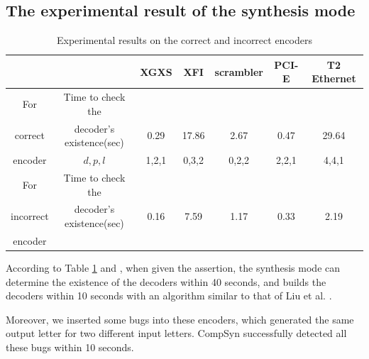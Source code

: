 \documentclass[runningheads,a4paper]{llncs}
\begin{document}
\subsection{The experimental result of the synthesis mode}
\begin{table}[t]
\centering
\caption{Experimental results on the correct and incorrect encoders}
\begin{tabular}{|c|c|c|c|c|c|c|}
\hline
&                                        &XGXS     &XFI       &scrambler     &PCI-E    &T2 Ethernet\\ \hline\hline
For &Time to check the                         &&&&&\\
correct&decoder's existence(sec)                      &0.29     &17.86     &2.67      &0.47    &29.64\\\cline{2-7}
encoder&$d,p,l$                                 &1,2,1    &0,3,2     &0,2,2     &2,2,1   &4,4,1          \\ \hline\hline
For&Time to check the                          &&&&&\\
incorrect&decoder's existence(sec)             &0.16     &7.59     &1.17      &0.33    &2.19\\
encoder&                        &&&&&\\\hline

\end{tabular}\label{tab_prodes}
\end{table}

According to Table \ref{tab_prodes} and \cite{ShengYuShen:tcad11},
when given the assertion,
the synthesis mode can determine the existence of the decoders within 40 seconds,
and builds the decoders within 10 seconds with an algorithm similar to that of Liu et al. \cite{Roland:iccad11}.

Moreover,
we inserted some bugs into these encoders,
which generated the same output letter for two different input letters.
CompSyn successfully detected all these bugs within 10 seconds.
\end{document}
